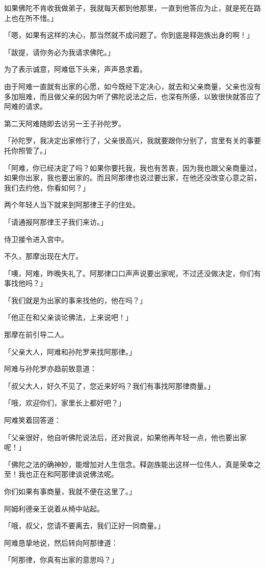 \documentclass[twoside,openany]{book}
\begin{document}
如果佛陀不肯收我做弟子，我就每天都到他那里，一直到他答应为止，就是死在路上也在所不惜。」

「嗯，如果有这样的决心，那当然就不成问题了。你到底是释迦族出身的啊！」

「跋提，请你务必为我请求佛陀。」

为了表示诚意，阿难低下头来，声声恳求着。

由于阿难一直就有出家的心愿，如今既经下定决心，就去和父亲商量，父亲也没有多加阻难，而且做父亲的因为听了佛陀说法之后，也深有所感，以致很快就答应了阿难的请求。

第二天阿难随即去访另一王子孙陀罗。

「孙陀罗，我决定出家修行了，父亲很高兴，我就要跟你分别了，宫里有关的事要托你照管了。」

「阿难，你已经决定了吗？如果你要托我，我也有苦衷，因为我也跟父亲商量过，如果你出家，我也要出家的。而且阿那律也说过要出家，在他还没改变心意之前，我们去约他，你看如何？」

两个年轻人当下就来到阿那律王子的住处。

「请通报阿那律王子我们来访。」

侍卫接令进入宫中。

不久，那摩出现在大厅。

「噢，阿难，昨晚失礼了。阿那律口口声声说要出家呢，不过还没做决定，你们有事找他吗？」

「我们就是为出家的事来找他的，他在吗？」

「他正在和父亲谈论佛法，上来说吧！」

那摩在前引导二人。

「父亲大人，阿难和孙陀罗来找阿那律。」

阿难与孙陀罗亦趋前致意道：

「叔父大人，好久不见了，您近来好吗？我们有事找阿那律商量。」

「哦，欢迎你们，家里长上都好吧？」

阿难笑着回答道：

「父亲很好，他自听佛陀说法后，还对我说，如果他再年轻一点，他也要出家呢！」

「佛陀之法的确神妙，能增加对人生信念。释迦族能出这样一位伟人，真是荣幸之至！我也正在和阿那律谈说佛法呢。

你们如果有事商量，我就不便在这里了。」

阿姆利德亲王说着从椅中站起。

「哦，叔父，您请不要离去，我们正好一同商量。」

阿难恳挚地说，然后转向阿那律道：

「阿那律，你真有出家的意思吗？」
\end{document}
